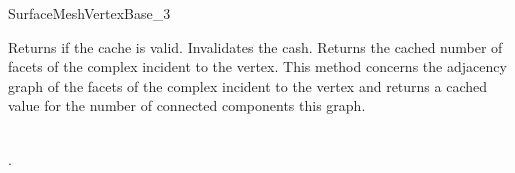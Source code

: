 \begin{ccRefConcept}{SurfaceMeshVertexBase_3}
\ccCreation
{}  %


\ccOperations


{Returns  if the cache is valid.}
\ccGlue
{}
{Invalidates the cash.}
\ccGlue
{}
{Returns the cached number of facets of the complex incident to the vertex.}
\ccGlue
{}
{ This method concerns the adjacency
graph of  the facets of the complex incident to the vertex
and returns a cached value for the number of connected components this graph.}

\ccHasModels



\ccSeeAlso

 \\
.





\end{ccRefConcept}



